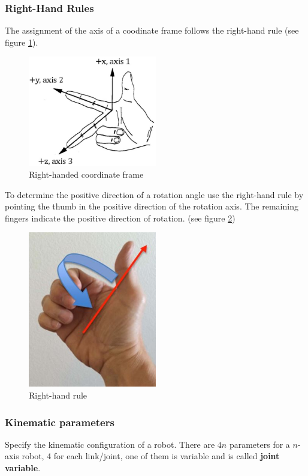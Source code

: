 \documentclass{article}
\begin{document}
	\subsubsection{Right-Hand Rules}
	The assignment of the axis of a coodinate frame follows the right-hand rule (see figure \ref{fig:right-hand-frame}).\\
	\begin{figure}[h]
		\includegraphics[width=0.5\textwidth]{figures/right-hand-frame.JPG}
		\caption{Right-handed coordinate frame}
		\label{fig:right-hand-frame}
	\end{figure}
	To determine the positive direction of a rotation angle use the right-hand rule by pointing the thumb in the positive direction of the rotation axis. The remaining fingers indicate the positive direction of rotation. (see figure \ref{fig:right-hand-rule})
	\begin{figure}[h]
		\includegraphics[width=0.5\textwidth]{figures/right-hand-rule.JPG}
		\caption{Right-hand rule}
		\label{fig:right-hand-rule}
	\end{figure}
	
	\subsubsection{Kinematic parameters}
	Specify the kinematic configuration of a robot. There are $4n$ parameters for a $n$-axis robot, 4 for each link/joint, one of them is variable and is called \textbf{joint variable}.
	
\end{document}
